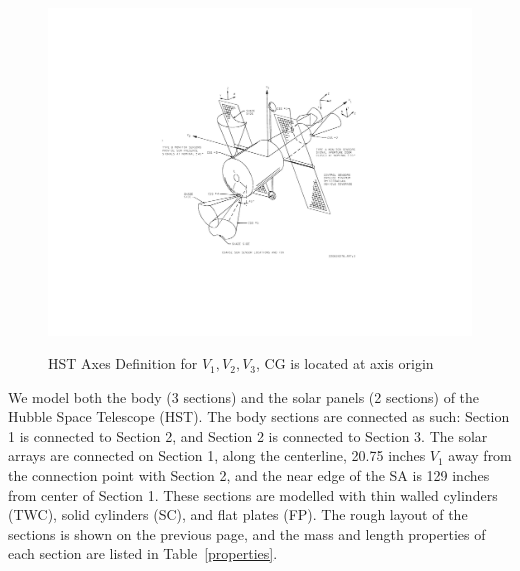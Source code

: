 \documentclass[onecolumn,10pt]{jhwhw}
\begin{document}
\begin{figure}[h!]
\begin{center}
\includegraphics[height=0.45\textheight]{hst_axes.pdf}
\label{fig:on}
\end{center}
\caption{HST Axes Definition for $V_1, V_2, V_3$, CG is located at axis origin}
\end{figure}

We model both the body (3 sections) and the solar panels (2 sections) of the Hubble Space Telescope (HST). The body sections are connected as such: Section 1 is connected to Section 2, and Section 2 is connected to Section 3. The solar arrays are connected on Section 1, along the centerline, 20.75 inches $V_1$ away from the connection point with Section 2, and the near edge of the SA is 129 inches from center of Section 1. These sections are modelled with thin walled cylinders (TWC), solid cylinders (SC), and flat plates (FP). The rough layout of the sections is shown on the previous page, and the mass and length properties of each section are listed in Table~\ref{properties}.
\end{document}
